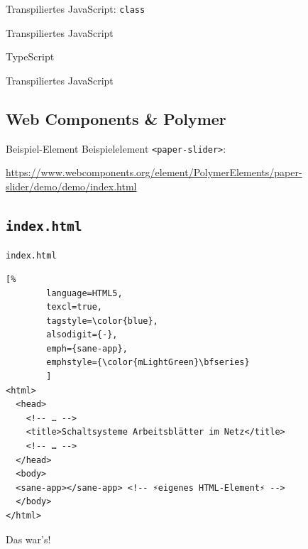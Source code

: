 \documentclass{beamer}
\begin{document}
\begin{frame}[fragile]{Transpiliertes JavaScript: \texttt{class}}
	
	\hfill
	
\end{frame}


\begin{frame}[fragile]{Transpiliertes JavaScript}
		
	\hfill
		
\end{frame}

\begin{frame}[fragile]{TypeScript}
	
\end{frame}

\begin{frame}[fragile]{Transpiliertes JavaScript}
	
\end{frame}


\subsection{Web Components \& Polymer}
\begin{frame}{Beispiel-Element}
	Beispielelement \texttt{<paper-slider>}:

	\url{https://www.webcomponents.org/element/PolymerElements/paper-slider/demo/demo/index.html}
\end{frame}

\subsection{\texttt{index.html}}
\begin{frame}[fragile]{\texttt{index.html}}
	\begin{lstlisting}[%
		language=HTML5,
		texcl=true,
		tagstyle=\color{blue},
		alsodigit={-},
		emph={sane-app},
		emphstyle={\color{mLightGreen}\bfseries}
		]
<html>
  <head>
    <!-- … -->
    <title>Schaltsysteme Arbeitsblätter im Netz</title>
    <!-- … -->
  </head>
  <body>
  <sane-app></sane-app> <!-- ⚡eigenes HTML-Element⚡ -->
  </body>
</html>
	\end{lstlisting}
	Das war's! \faSmileO
\end{frame}
\end{document}
